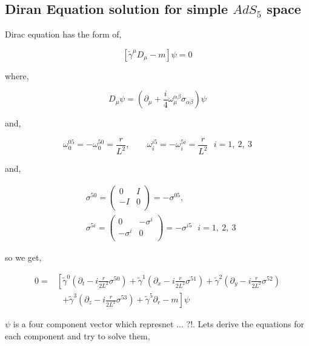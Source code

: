 \subsection{Diran Equation solution for simple $AdS_5$ space}

Dirac equation has the form of,

\begin{equation}
   \left[\tilde{\gamma}^{\mu}D_{\mu} - m\right]\psi = 0
\end{equation}

where,

\begin{equation}
   D_{\mu} \psi = \left(\partial_{\mu} + \frac{i}{4}\omega^{\alpha\beta}_{\mu}\sigma_{\alpha\beta}\right) \psi
\end{equation}

and,

\begin{equation}
   \omega^{05}_{0} = -\omega^{50}_{0} = \frac{r}{L^2}, \qquad 
   \omega^{i5}_{i} = -\omega^{5i}_{i} = \frac{r}{L^2} ~~~ i=1,~2,~3
\end{equation}

and,

\begin{align}
   &\sigma^{50} = \begin{pmatrix} 0 & I \\ -I & 0 \\ \end{pmatrix} = -\sigma^{05}, \quad \nonumber\\
   &\sigma^{5i} = \begin{pmatrix} 0 & -\sigma^i \\ -\sigma^i & 0 \\ \end{pmatrix}= -\sigma^{i5} ~~~ i=1,~2,~3 
\end{align}

so we get,

\begin{align}
   0 =& \left[ \tilde{\gamma}^0 \left(\partial_t - i\frac{r}{2L^2}\sigma^{50} \right) + \tilde{\gamma}^1 \left(\partial_x - i\frac{r}{2L^2}\sigma^{51} \right) + \tilde{\gamma}^2 \left(\partial_y - i\frac{r}{2L^2}\sigma^{52} \right) \right. \nonumber\\
      & ~~~  \left. + \tilde{\gamma}^3 \left(\partial_z - i\frac{r}{2L^2}\sigma^{53} \right) + \tilde{\gamma}^5 \partial_r - m\right] \psi
\end{align}

$\psi$ is a four component vector which represnet ... ?!. Lets derive the equations for each component and try to solve them, 

